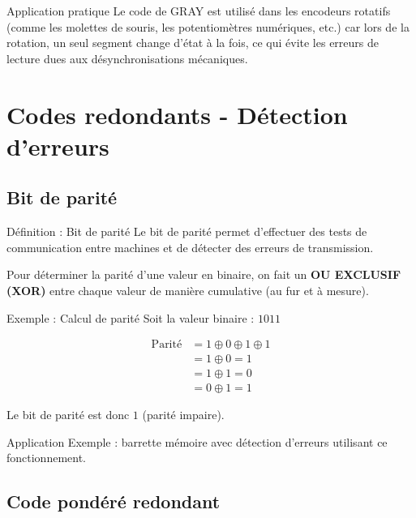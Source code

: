 \documentclass[a4paper,12pt]{article}
\begin{document}
\begin{remarkbox}{Application pratique}
Le code de GRAY est utilisé dans les encodeurs rotatifs (comme les molettes de souris, les potentiomètres numériques, etc.) car lors de la rotation, un seul segment change d'état à la fois, ce qui évite les erreurs de lecture dues aux désynchronisations mécaniques.
\end{remarkbox}

\newpage
\section{Codes redondants - Détection d'erreurs}

\subsection{Bit de parité}

\begin{defbox}{Définition : Bit de parité}
Le bit de parité permet d'effectuer des tests de communication entre machines et de détecter des erreurs de transmission.

Pour déterminer la parité d'une valeur en binaire, on fait un \textbf{OU EXCLUSIF (XOR)} entre chaque valeur de manière cumulative (au fur et à mesure).
\end{defbox}

\begin{examplebox}{Exemple : Calcul de parité}
Soit la valeur binaire : $1011$

\begin{align*}
\text{Parité} &= 1 \oplus 0 \oplus 1 \oplus 1 \\
              &= 1 \oplus 0 = 1 \\
              &= 1 \oplus 1 = 0 \\
              &= 0 \oplus 1 = 1
\end{align*}

Le bit de parité est donc $1$ (parité impaire).
\end{examplebox}

\begin{remarkbox}{Application}
Exemple : barrette mémoire avec détection d'erreurs utilisant ce fonctionnement.
\end{remarkbox}

\subsection{Code pondéré redondant}
\end{document}
